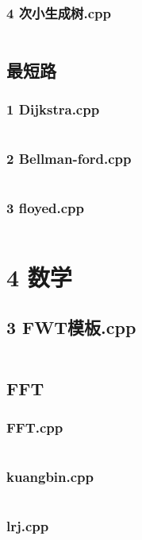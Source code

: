 \documentclass{article}
\begin{document}
\subsubsection{4 次小生成树.cpp}
\inputminted{c++}{/home/zzuzxy/t2/Template1.0/3 图论/最小生成树/4 次小生成树.cpp}
\subsection{最短路}
\subsubsection{1 Dijkstra.cpp}
\inputminted{c++}{/home/zzuzxy/t2/Template1.0/3 图论/最短路/1 Dijkstra.cpp}
\subsubsection{2 Bellman-ford.cpp}
\inputminted{c++}{/home/zzuzxy/t2/Template1.0/3 图论/最短路/2 Bellman-ford.cpp}
\subsubsection{3 floyed.cpp}
\inputminted{c++}{/home/zzuzxy/t2/Template1.0/3 图论/最短路/3 floyed.cpp}
\section{4 数学}
\subsection{3 FWT模板.cpp}
\inputminted{c++}{/home/zzuzxy/t2/Template1.0/4 数学/3 FWT模板.cpp}
\subsection{FFT}
\subsubsection{FFT.cpp}
\inputminted{c++}{/home/zzuzxy/t2/Template1.0/4 数学/FFT/FFT.cpp}
\subsubsection{kuangbin.cpp}
\inputminted{c++}{/home/zzuzxy/t2/Template1.0/4 数学/FFT/kuangbin.cpp}
\subsubsection{lrj.cpp}
\inputminted{c++}{/home/zzuzxy/t2/Template1.0/4 数学/FFT/lrj.cpp}
\end{document}
